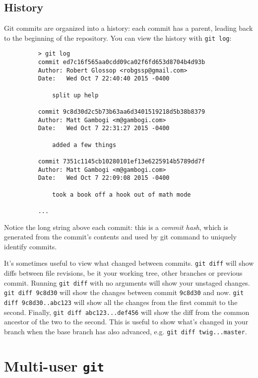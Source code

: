 \documentclass[11pt]{report}
\begin{document}
\section{History}

Git commits are organized into a history: each commit has a parent,
leading back to the beginning of the repository. You can view the
history with \texttt{git log}:

\begin{figure}[H]
  \begin{lstlisting}
    > git log
    commit ed7c16f565aa0cdd09ca02f6fd653d8704b4d93b
    Author: Robert Glossop <robgssp@gmail.com>
    Date:   Wed Oct 7 22:40:40 2015 -0400
    
        split up help
    
    commit 9c8d30d2c5b73b63aa6d3401519218d5b38b8379
    Author: Matt Gambogi <m@gambogi.com>
    Date:   Wed Oct 7 22:31:27 2015 -0400
    
        added a few things
    
    commit 7351c1145cb10280101ef13e6225914b5789dd7f
    Author: Matt Gambogi <m@gambogi.com>
    Date:   Wed Oct 7 22:09:08 2015 -0400
    
        took a book off a hook out of math mode

    ...
  \end{lstlisting}
\end{figure}

Notice the long string above each commit: this is a \emph{commit
  hash}, which is generated from the commit's contents and used by git
command to uniquely identify commits.

It's sometimes useful to view what changed between commits.
\texttt{git diff} will show diffs between file revisions, be it your
working tree, other branches or previous commit. Running \texttt{git
  diff} with no arguments will show your unstaged changes. \texttt{git
  diff 9c8d30} will show the changes between commit \texttt{9c8d30}
and now. \texttt{git diff 9c8d30..abc123} will show all the changes
from the first commit to the second. Finally, \texttt{git diff
  abc123...def456} will show the diff from the common ancestor of the
two to the second. This is useful to show what's changed in your
branch when the base branch has also advanced, e.g. \texttt{git diff
  twig...master}.

\chapter{Multi-user \texttt{git}}
\end{document}
